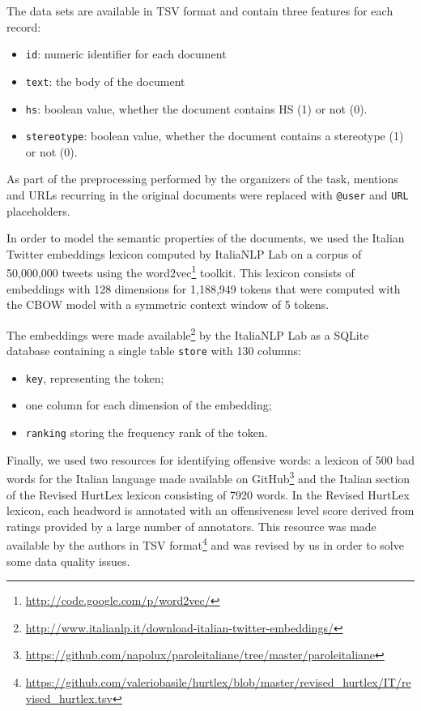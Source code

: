 \documentclass[a4paper, 9pt, twocolumn, DIV=calc]{scrartcl}
\begin{document}
The data sets are available in TSV format and contain three features for each record:
\begin{itemize}
    \item{\texttt{id}:} numeric identifier for each document
    \item{\texttt{text}:} the body of the document
    \item{\texttt{hs}:} boolean value, whether the document contains HS (1) or not (0).
    \item{\texttt{stereotype}:} boolean value, whether the document contains a stereotype (1) or not (0).
\end{itemize}

As part of the preprocessing performed by the organizers of the task, mentions and URLs recurring in the original documents were replaced with \texttt{@user} and \texttt{URL} placeholders.

In order to model the semantic properties of the documents, we used the Italian Twitter embeddings \cite{italian_twitter_embeddings} lexicon computed by ItaliaNLP Lab on a corpus of 50,000,000 tweets using the word2vec\footnote{\url{http://code.google.com/p/word2vec/}} toolkit.
This lexicon consists of embeddings with 128 dimensions for 1,188,949 tokens that were computed with the CBOW model with a symmetric context window of 5 tokens.

The embeddings were made available\footnote{\url{http://www.italianlp.it/download-italian-twitter-embeddings/}} by the ItaliaNLP Lab as a SQLite database containing a single table \texttt{store} with 130 columns:
\begin{itemize}
    \item \texttt{key}, representing the token;
    \item one column for each dimension of the embedding;
    \item \texttt{ranking} storing the frequency rank of the token.
\end{itemize}

Finally, we used two resources for identifying offensive words: a lexicon of 500 bad words for the Italian language made available on GitHub\footnote{\url{https://github.com/napolux/paroleitaliane/tree/master/paroleitaliane}} and the Italian section of the Revised HurtLex lexicon \cite{hurtlex} consisting of 7920 words. In the Revised HurtLex lexicon, each headword is annotated with an offensiveness level score derived from ratings provided by a large number of annotators. This resource was made available by the authors in TSV format\footnote{\url{https://github.com/valeriobasile/hurtlex/blob/master/revised_hurtlex/IT/revised_hurtlex.tsv}} and was revised by us in order to solve some data quality issues.
\end{document}
